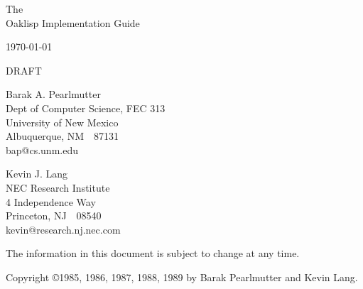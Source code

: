 %
%
%


\begin{titlepage}

\begin{center}

\vspace*{1in}

\Huge
 The \\
 Oaklisp Implementation Guide \\

\vspace{.5in}

\large
 \today \\

\vspace{.25in}

\Huge
 DRAFT \\

\vspace{.5in}

\Large
 Barak A. Pearlmutter \\
\large
 Dept of Computer Science, FEC 313\\
 University of New Mexico\\
 Albuquerque, NM~~87131\\
 bap@cs.unm.edu\\

\vspace{.5in}

\Large
 Kevin J. Lang \\
\large
 NEC Research Institute \\
 4 Independence Way \\
 Princeton, NJ~~08540 \\
 kevin@research.nj.nec.com

\vfill

\vspace{0.25in}

 The information in this document is subject to change at any time.

\end{center}

\end{titlepage}


\thispagestyle{empty}

\vspace*{6in}

\normalsize
\noindent Copyright \copyright 1985, 1986, 1987, 1988, 1989
 by Barak Pearlmutter and Kevin Lang.


\newpage



